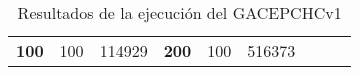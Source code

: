 \begin{table}[H]
\begin{tabular}{|ccrccrccc}
\multicolumn{1}{|c|}{\multirow{-39}{*}{\cellcolor[HTML]{FFFFC7}\textbf{100}}} & \multicolumn{1}{c|}{\multirow{-9}{*}{\cellcolor[HTML]{DDFDFF}100}} & \multicolumn{1}{r|}{\cellcolor[HTML]{DAE8FC}114929}    & \multicolumn{1}{c|}{\multirow{-39}{*}{\cellcolor[HTML]{FFFFC7}\textbf{200}}} & \multicolumn{1}{c|}{\multirow{-10}{*}{\cellcolor[HTML]{DDFDFF}100}} & \multicolumn{1}{r|}{\cellcolor[HTML]{DDFDFF}516373}    &                                                                              &                                                                    &                                                        \\ \cline{1-6}
\end{tabular}
\caption{\label{t:GACEPCHCv1}Resultados de la ejecución del GACEPCHCv1}
\end{table}


